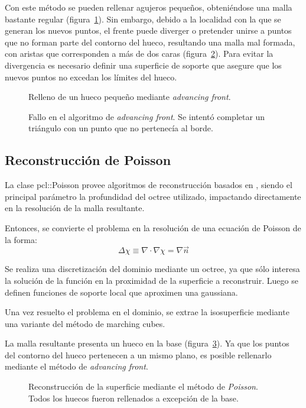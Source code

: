 		Con este método se pueden rellenar agujeros pequeños, obteniéndose una malla bastante regular (figura~\ref{fig:fill_good}).
		Sin embargo, debido a la localidad con la que se generan los nuevos
		puntos, el frente puede diverger o pretender unirse a puntos que no
		forman parte del contorno del hueco, resultando una malla mal formada,
		con aristas que corresponden a más de dos caras (figura~\ref{fig:fill_bad}).
		Para evitar la divergencia es necesario definir una superficie de
		soporte que asegure que los nuevos puntos no excedan los límites del
		hueco.

	\begin{figure}
		\caption{\label{fig:fill_good}Relleno de un hueco pequeño mediante \emph{advancing front}.}
	\end{figure}

	\begin{figure}
		\caption{\label{fig:fill_bad}Fallo en el algoritmo de \emph{advancing front}. Se intentó completar un triángulo con un punto que no pertenecía al borde.}
	\end{figure}

	\subsection{Reconstrucción de Poisson}
	La clase pcl::Poisson provee algoritmos de reconstrucción basados en \cite{Kazhdan:2006:PSR:1281957.1281965}, %
	siendo el principal parámetro la profundidad del octree utilizado,
	impactando directamente en la resolución de la malla resultante.


	Entonces, se convierte el problema en la resolución de una ecuación de Poisson de la forma:
	\[\Delta\chi \equiv \nabla \cdot\nabla\chi = \nabla \vec{n}\]

	Se realiza una discretización del dominio mediante un octree, ya que sólo
	interesa la solución de la función en la proximidad de la superficie a
	reconstruir.
	Luego se definen funciones de soporte local que aproximen una gaussiana.

	Una vez resuelto el problema en el dominio, se extrae la isosuperficie mediante una variante del método de marching cubes.

	La malla resultante presenta un hueco en la base (figura~\ref{fig:fill_poisson}).
	Ya que los puntos del contorno del hueco pertenecen a un mismo plano, es posible rellenarlo mediante el método de \emph{advancing front}.

	\begin{figure}
		\caption{\label{fig:fill_poisson}Reconstrucción de la superficie mediante el método de \emph{Poisson}. Todos los huecos fueron rellenados a excepción de la base.}
	\end{figure}

